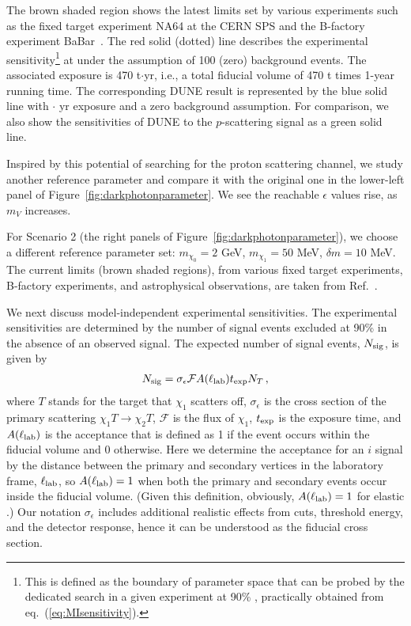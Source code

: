 The brown shaded region shows the latest limits set by various experiments such as the fixed target experiment NA64 at the CERN SPS and the B-factory experiment BaBar~\cite{Banerjee:2017hhz}.
The red solid (dotted) line describes the experimental sensitivity\footnote{This is defined as the boundary of parameter space that can be probed by the dedicated search in a given experiment at 90\% , practically obtained from eq.~(\ref{eq:MIsensitivity}).} at  under the assumption of 100 (zero) background events. 
The associated exposure is 470 t$\cdot$yr, i.e., a total fiducial volume of 470 t times 1-year running time. 
The corresponding DUNE result is represented by the blue solid line with \fdfiducialmass $\cdot$ yr exposure and a zero background assumption. 
For comparison, we also show the sensitivities of DUNE to the $p$-scattering signal as a green solid line. 

Inspired by this potential of searching for the proton scattering channel, we study another reference parameter and compare it with the original one in the lower-left panel of Figure~\ref{fig:darkphotonparameter}. 
We see the reachable $\epsilon$ values rise, as $m_V$ increases. 


For Scenario 2 (the right panels of Figure~\ref{fig:darkphotonparameter}), we choose a different reference parameter set: $m_{\chi_0} = 2$ GeV, $m_{\chi_1} = 50$ MeV, $\delta m = 10$ MeV. 
The current limits (brown shaded regions), from various fixed target experiments, B-factory experiments, and astrophysical observations, are taken from Ref.~\cite{Banerjee:2018vgk}.


We next discuss model-independent experimental sensitivities. 
The experimental sensitivities are determined by the number of signal events excluded at 90\%  in the absence of an observed signal.
The expected number of signal events, $N_{\rm sig}$, is given by
\begin{align}
N_{\rm sig} = \sigma_\epsilon \mathcal F A(\ell_{\rm lab}) t_{\rm exp} N_T\,,
\label{eq:NS}
\end{align}
where $T$ stands for the target that $\chi_1$ scatters off, $\sigma_\epsilon$ is the cross section of the primary scattering $\chi_1 T \to \chi_2 T$, $\mathcal F$ is the flux of $\chi_1$, $t_{\rm exp}$ is the exposure time, and $A(\ell_{\rm lab})$ is the acceptance that is defined as 1 if the event occurs within the fiducial volume and 0 otherwise.
Here we determine the acceptance for an $i$ signal by the distance between the primary and secondary vertices in the laboratory frame, $\ell_{\rm lab}$, so $A(\ell_{\rm lab}) = 1$ when both the primary and secondary events occur inside the fiducial volume. (Given this definition, obviously, $A(\ell_{\rm lab}) = 1$ for elastic .)
Our notation $\sigma_\epsilon$ includes additional realistic effects from cuts, threshold energy, and the detector response, hence it can be understood as the fiducial cross section.

